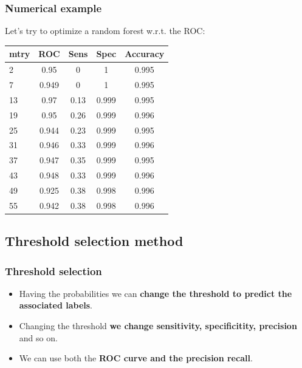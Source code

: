 \documentclass[9pt]{beamer}
\begin{document}
\begin{frame}
\frametitle{Numerical example}
Let's try to optimize a random forest w.r.t. the ROC:
\begin{table}
\begin{tabular}{l | c | c | c | c }
mtry & ROC & Sens & Spec & Accuracy \\
\hline \hline
2 & 0.95 & 0 & 1 & 0.995 \\ 
7 & 0.949 & 0 & 1 & 0.995 \\
13 & 0.97 & 0.13 & 0.999 & 0.995 \\
19 & 0.95 & 0.26 & 0.999 & 0.996 \\
25 & 0.944 & 0.23 & 0.999 & 0.995 \\
31 & 0.946 & 0.33 & 0.999 & 0.996 \\
37 & 0.947 & 0.35 & 0.999 & 0.995 \\
43 & 0.948 & 0.33 & 0.999 & 0.996 \\
49 & 0.925 & 0.38 & 0.998 & 0.996 \\
55 & 0.942 & 0.38 & 0.998 & 0.996 \\
\end{tabular}
\end{table}
\end{frame}

\subsection{Threshold selection method}
\begin{frame}
\frametitle{Threshold selection}
\begin{itemize}
\item<1 -> Having the probabilities we can \textbf{change the threshold to predict the associated labels}.
\item<2 -> Changing the threshold \textbf{we change sensitivity, specificitity, precision} and so on.
\item<3 -> We can use both the \textbf{ROC curve and the precision recall}.
\end{itemize}
\end{frame}
\end{document}
